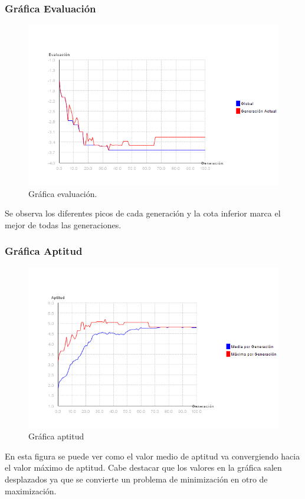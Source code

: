 \documentclass[12pt]{article}
\begin{document}
\subsubsection*{Gráfica Evaluación}
\begin{figure}[H]
\centering
\includegraphics[scale=0.4]{graficas/F5inicial_algoritmo}
\caption{Gráfica evaluación.}
\label{fig}
\end{figure}
	Se observa los diferentes picos de cada generación y la cota inferior marca el mejor de todas las generaciones.

\subsubsection*{Gráfica Aptitud}
\begin{figure}[H]
\centering
\includegraphics[scale=0.4]{graficas/F5inicial_aptitud}
\caption{Gráfica aptitud}
\label{fig}
\end{figure}
	En esta figura se puede ver como el valor medio de aptitud va convergiendo hacia el valor máximo de aptitud. Cabe destacar que los valores en la gráfica salen desplazados ya que se convierte un problema de minimización en otro de maximización.
\end{document}
